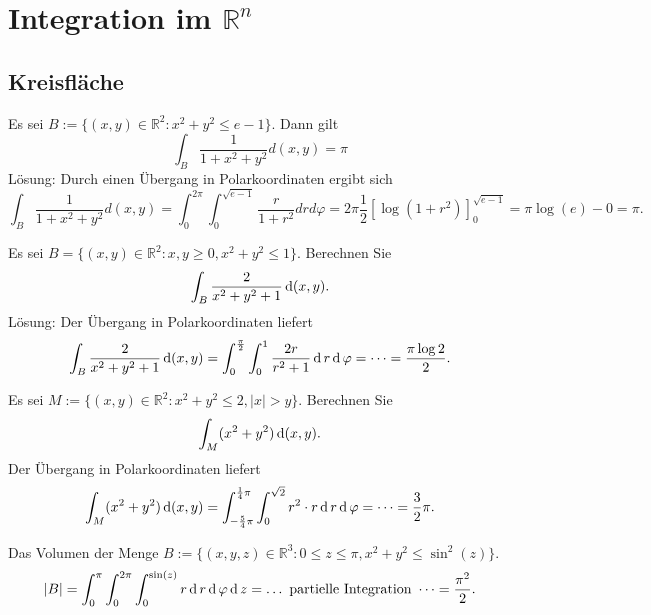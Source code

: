 \section{Integration im $\mathbb{R}^n$}
\subsection{Kreisfläche}
Es sei $B:= \{(x,y) \in \mathbb{R}^2 : x^2 + y^2 \leq e - 1\}$.
Dann gilt
\begin{displaymath}
  \int_{B} \frac{1}{1 + x^2 + y^2}d(x,y) = \pi
\end{displaymath}
Lösung:
Durch einen Übergang in Polarkoordinaten ergibt sich
\begin{displaymath}
  \int_{B} \frac{1}{1 + x^2 + y^2} d(x,y) = \int_{0}^{2\pi} \int_{0}^{\sqrt{e - 1}} \frac{r}{1 + r^2} drd\varphi = 2\pi \frac{1}{2}[\log(1 + r^2)]_{0}^{\sqrt{e-1}} = \pi \log(e) - 0 = \pi.
\end{displaymath}

Es sei $B = \{(x,y) \in \mathbb{R}^2 : x,y \geq 0, x^2 + y^2 \leq 1\}$.
Berechnen Sie
\begin{displaymath}
  \int_B \frac{2}{x^2 + y^2 + 1} \operatorname{\mathop{}\!\mathrm{d}} (x,y).
\end{displaymath}
Lösung:
Der Übergang in Polarkoordinaten liefert
\begin{displaymath}
  \int_B \frac{2}{x^2 + y^2 + 1} \operatorname{\mathop{}\!\mathrm{d}} (x,y) = \int_0^{\frac{\pi}{2}} \int_0^1 \frac{2r}{r^2 + 1} \operatorname{\mathop{}\!\mathrm{d}} r \operatorname{\mathop{}\!\mathrm{d}} \varphi = \dots = \frac{\pi \log 2}{2}.
\end{displaymath}

Es sei $M := \{(x,y) \in \mathbb{R}^2 : x^2 + y^2 \leq 2, |x| > y\}$.
Berechnen Sie
\begin{displaymath}
  \int_M (x^2 + y^2) \operatorname{\mathop{}\!\mathrm{d}} (x,y).
\end{displaymath}
Der Übergang in Polarkoordinaten liefert
\begin{displaymath}
  \int_M (x^2 + y^2) \operatorname{\mathop{}\!\mathrm{d}} (x,y) = \int_{-\frac{5}{4}\pi}^{\frac{1}{4} \pi} \int_0^{\sqrt{2}} r^2 \cdot r \operatorname{\mathop{}\!\mathrm{d}} r \operatorname{\mathop{}\!\mathrm{d}} \varphi = \dots = \frac{3}{2} \pi.
\end{displaymath}

Das Volumen der Menge $B := \{(x,y,z) \in \mathbb{R}^3 : 0 \leq z \leq \pi, x^2 + y^2 \leq \sin^2(z)\}$.
\begin{displaymath}
  |B| = \int_0^{\pi} \int_0^{2\pi} \int_0^{\sin(z)} r \operatorname{\mathop{}\!\mathrm{d}} r \operatorname{\mathop{}\!\mathrm{d}} \varphi \operatorname{\mathop{}\!\mathrm{d}} z = \dots \text{ partielle Integration } \dots = \frac{\pi^2}{2}.
\end{displaymath}

